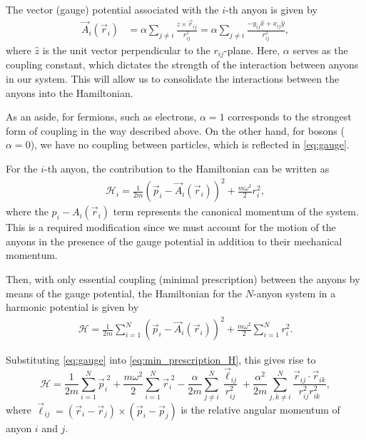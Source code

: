 The vector (gauge) potential associated with the $i$-th anyon is given by~\cite{Khare2005,Date2003,Moriyasu1983}
\begin{align}
    \vec{A}_i(\vec{r}_i) &= \alpha\sum_{j\neq i}\frac{\hat{z}\times \vec{r}_{ij}}{r_{ij}^2} = \alpha\sum_{j\neq i}\frac{-y_{ij}\hat{x} + x_{ij}\hat{y}}{r_{ij}^2}, \label{eq:gauge}
\end{align}
where $\hat{z}$ is the unit vector perpendicular to the $r_{ij}$-plane. Here, $\alpha$ serves as the coupling constant, which dictates the strength of the interaction between anyons in our system. This will allow us to consolidate the interactions between the anyons into the Hamiltonian.

As an aside, for fermions, such as electrons, $\alpha=1$ corresponds to the strongest form of coupling in the way described above. On the other hand, for bosons ($\alpha=0$), we have no coupling between particles, which is reflected in \cref{eq:gauge}.

For the $i$-th anyon, the contribution to the Hamiltonian can be written as
\begin{align}
    \mathcal{H}_i = \frac{1}{2m}{(\vec{p}_i - \vec{A}_i(\vec{r}_i))}^2 + \frac{m\omega^2}{2}{r}_i^{2},
\end{align}
where the $p_i - A_i(\vec{r}_i)$ term represents the canonical momentum of the system. This is a required modification since we must account for the motion of the anyons in the presence of the gauge potential in addition to their mechanical momentum.

Then, with only essential coupling  (minimal prescription) between the anyons by means of the gauge potential, the Hamiltonian for the $N$-anyon system in a harmonic potential is given by
\begin{align}
    \mathcal{H} = \frac{1}{2m} \sum_{i=1}^{N}{(\vec{p}_i - \vec{A}_i(\vec{r}_i))}^2 + \frac{m\omega^2}{2}\sum_{i=1}^{N}{r}_i^{2}. \label{eq:min_prescription_H}
\end{align}

Substituting \cref{eq:gauge} into \cref{eq:min_prescription_H}, this gives rise to
\begin{equation}
    \mathcal{H} = \frac{1}{2m}\sum_{i=1}^{N}\vec{p}_i^{\;2} + \frac{m\omega^2}{2}\sum_{i=1}^{N}\vec{r}_i^{\;2} - \frac{\alpha}{2m}\sum_{j\neq i}^{N}\frac{\vec{\ell}_{ij}}{r_{ij}^2} + \frac{\alpha^2}{2m}\sum_{j,k\neq i}^{N}\frac{\vec{r}_{ij}\cdot\vec{r}_{ik}}{r_{ij}^2r_{ik}^2},\label{eq:full_H}
\end{equation}
where $\vec{\ell}_{ij} = (\vec{r}_i-\vec{r}_j)\times(\vec{p}_i-\vec{p}_j)$ is the relative angular momentum of anyon $i$ and $j$.

